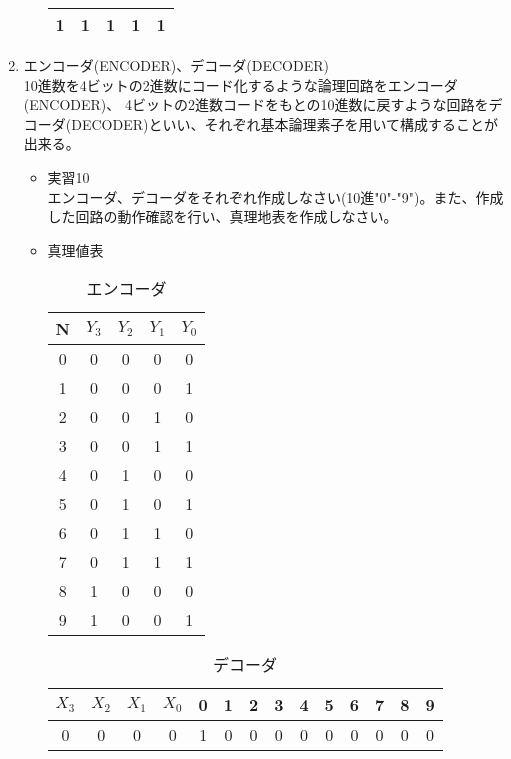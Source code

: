 \documentclass[dvipdfmx]{jsarticle}
\begin{document}
\begin{enumerate}
\begin{itemize}
\begin{table}[H]
\begin{tabular}{|c|c|c|c|c|}
											1 & 1 & 1 & 1 & 1\\ \hline
										\end{tabular}
									\end{table}
							\end{itemize}
						\item エンコーダ(ENCODER)、デコーダ(DECODER) \\
							10進数を4ビットの2進数にコード化するような論理回路をエンコーダ(ENCODER)、
							4ビットの2進数コードをもとの10進数に戻すような回路をデコーダ(DECODER)といい、それぞれ基本論理素子を用いて構成することが出来る。
							\begin{itemize}
								\item 実習10 \\
									エンコーダ、デコーダをそれぞれ作成しなさい(10進"0"-"9")。また、作成した回路の動作確認を行い、真理地表を作成しなさい。
								\item 真理値表
									\begin{table}[H]
									\center
									\caption{エンコーダ\label{tb:encoder}}
									\begin{tabular}{|c|c|c|c|c|}
										\hline
										N & $Y_3$ & $Y_2$ & $Y_1$ &$Y_0$ \\ \hline
										0 & 0 & 0 & 0 & 0 \\ \hline
										1 & 0 & 0 & 0 & 1\\ \hline
										2 & 0 & 0 & 1 & 0\\ \hline
										3 & 0 & 0 & 1 & 1\\ \hline
										4 & 0 & 1 & 0 & 0 \\ \hline
										5 & 0 & 1 & 0 & 1\\ \hline
										6 & 0 & 1 & 1 & 0\\ \hline
										7 & 0 & 1 & 1 & 1\\ \hline
										8 & 1 & 0 & 0 & 0\\ \hline
										9 & 1 & 0 & 0 & 1\\ \hline
									\end{tabular}
								\end{table}					
								\begin{table}[H]
									\center
									\caption{デコーダ\label{tb:encoder}}
									\begin{tabular}{|c|c|c|c|c|c|c|c|c|c|c|c|c|c|}
										\hline
										$X_3$ & $X_2$ & $X_1$ & $X_0$ & 0 & 1 & 2 & 3 & 4 & 5 & 6 & 7 & 8 & 9 \\ \hline
										    0 &     0 &     0 &     0 & 1 & 0 & 0 & 0 & 0 & 0 & 0 & 0 & 0 & 0 \\ \hline

\end{tabular}
\end{table}
\end{itemize}
\end{enumerate}
\end{document}
